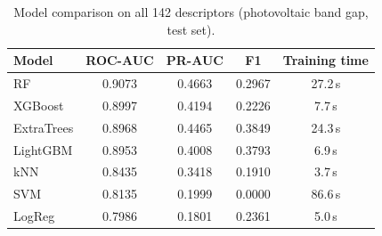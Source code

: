 \begin{table}[H]
\centering\small
\begin{tabular}{lcccc}
\toprule
Model & ROC-AUC & PR-AUC & F1 & Training time\\
\midrule
RF & 0.9073 & 0.4663 & 0.2967 & 27.2\,s \\
XGBoost & 0.8997 & 0.4194 & 0.2226 & 7.7\,s \\
ExtraTrees & 0.8968 & 0.4465 & 0.3849 & 24.3\,s \\
LightGBM & 0.8953 & 0.4008 & 0.3793 & 6.9\,s \\
kNN & 0.8435 & 0.3418 & 0.1910 & 3.7\,s \\
SVM & 0.8135 & 0.1999 & 0.0000 & 86.6\,s \\
LogReg & 0.7986 & 0.1801 & 0.2361 & 5.0\,s \\
\bottomrule
\end{tabular}
\caption*{Model comparison on all 142 descriptors (photovoltaic band gap, test set).}
\end{table}
